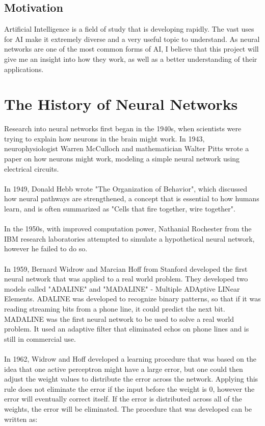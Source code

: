 \documentclass[titlepage]{article}
\begin{document}
\subsection{Motivation}
Artificial Intelligence is a field of study that is developing rapidly. The vast uses for AI make it extremely diverse and a very useful topic to understand. As neural networks are one of the most common forms of AI, I believe that this project will give me an insight into how they work, as well as a better understanding of their applications. 

\newpage
\section{The History of Neural Networks}\cite{History of Neural Networks}
Research into neural networks first began in the 1940s, when scientists were trying to explain how neurons in the brain might work. In 1943, neurophysiologist Warren McCulloch and mathematician Walter Pitts wrote a paper on how neurons might work, modeling a simple neural network using electrical circuits.
\\\\
In 1949, Donald Hebb wrote "The Organization of Behavior", which discussed how neural pathways are strengthened, a concept that is essential to how humans learn, and is often summarized as "Cells that fire together, wire together".
\\\\
In the 1950s, with improved computation power, Nathanial Rochester from the IBM research laboratories attempted to simulate a hypothetical neural network, however he failed to do so.
\\\\
In 1959, Bernard Widrow and Marcian Hoff from Stanford developed the first neural network that was applied to a real world problem. They developed two models called "ADALINE" and "MADALINE" - Multiple ADAptive LINear Elements. ADALINE was developed to recognize binary patterns, so that if it was reading streaming bits from a phone line, it could predict the next bit. MADALINE was the first neural network to be used to solve a real world problem. It used an adaptive filter that eliminated echos on phone lines and is still in commercial use.
\\\\
In 1962, Widrow and Hoff developed a learning procedure that was based on the idea that one active perceptron might have a large error, but one could then adjust the weight values to distribute the error across the network. Applying this rule does not eliminate the error if the input before the weight is 0, however the error will eventually correct itself. If the error is distributed across all of the weights, the error will be eliminated. The procedure that was developed can be written as:
\end{document}
